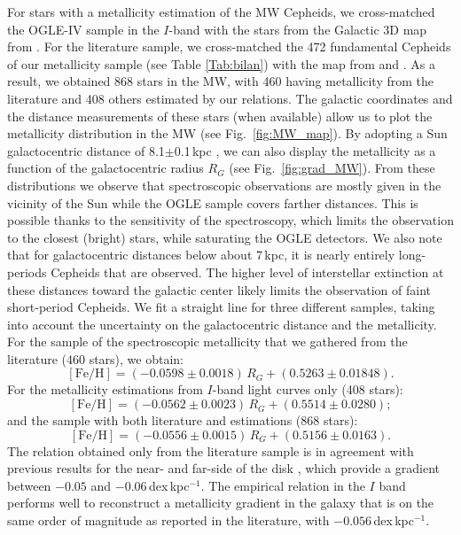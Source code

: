 \documentclass[article]{aa} %
\begin{document}
For stars with a metallicity estimation of the MW Cepheids, we cross-matched the OGLE-IV sample in the $I$-band with the stars from the Galactic 3D map from \cite{Skowron2019}. For the literature sample, we cross-matched the 472 fundamental Cepheids of our metallicity sample (see Table \ref{Tab:bilan}) with the map from \cite{Skowron2019} and \cite{Kovtyukh2022}. As a result, we obtained 868 stars in the MW, with 460 having metallicity from the literature and 408 others estimated by our relations. The galactic coordinates and the distance measurements of these stars (when available) allow us to plot the metallicity distribution in the MW (see Fig.~\ref{fig:MW_map}). By adopting a Sun galactocentric distance of 8.1$\pm$0.1$\,$kpc \citep{Bobylev2021}, we can also display the metallicity as a function of the galactocentric radius $R_G$ (see Fig.~\ref{fig:grad_MW}). From these distributions we observe that spectroscopic observations are mostly given in the vicinity of the Sun while the OGLE sample covers farther distances. This is possible thanks to the sensitivity of the spectroscopy, which limits the observation to the closest (bright) stars, while saturating the OGLE detectors. We also note that for galactocentric distances below about 7$\,$kpc, it is  nearly entirely long-periods Cepheids that are observed. The higher level of interstellar extinction at these distances toward the galactic center likely limits the observation of faint short-period Cepheids. We fit a straight line for three different samples, taking into account the uncertainty on the galactocentric distance and the metallicity. For the sample of the spectroscopic metallicity that we gathered from the literature (460 stars), we obtain:
\begin{equation}
    \mathrm{[Fe/H]}=(-0.0598\pm0.0018)\,R_G + (0.5263\pm0.01848).
\end{equation}
For the metallicity estimations from $I$-band light curves only (408 stars):
\begin{equation}
    \mathrm{[Fe/H]}=(-0.0562\pm0.0023)\,R_G + (0.5514\pm0.0280);
\end{equation}
and the sample with both literature and estimations (868 stars):
\begin{equation}
    \mathrm{[Fe/H]}=(-0.0556\pm0.0015)\,R_G +(0.5156\pm0.0163).
\end{equation}
The relation obtained only from the literature sample is in agreement with previous results for the near- and far-side of the disk \citep{Genovali2014, Luck2018,Minniti2020}, which provide a gradient between $-0.05$ and $-0.06\,$dex$\,$kpc$^{-1}$. The empirical relation in the $I$ band performs well to reconstruct a metallicity gradient in the galaxy that is on the same order of magnitude as reported in the literature, with $-0.056\,$dex$\,$kpc$^{-1}$.
\end{document}

